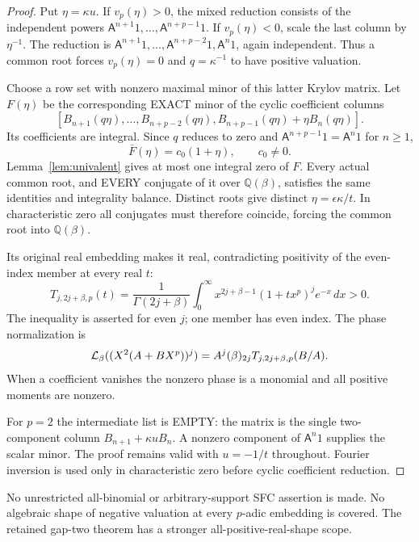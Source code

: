 \documentclass[11pt]{article}
\begin{document}
\begin{proof}
Put $\eta=\kappa u$. If $v_p(\eta)>0$, the mixed reduction consists
of the independent powers
$\mathsf A^{n+1}1,\ldots,\mathsf A^{n+p-1}1$.
If $v_p(\eta)<0$, scale the last column by $\eta^{-1}$.
The reduction is
$\mathsf A^{n+1}1,\ldots,\mathsf A^{n+p-2}1,\mathsf A^{n}1$,
again independent. Thus a common root forces $v_p(\eta)=0$
and $q=\kappa^{-1}$ to have positive valuation.

Choose a row set with nonzero maximal minor of this latter
Krylov matrix. Let $F(\eta)$ be the corresponding EXACT minor
of the cyclic coefficient columns
\[
 [B_{n+1}(q\eta),\ldots,B_{n+p-2}(q\eta),
                   B_{n+p-1}(q\eta)+\eta B_n(q\eta)].
\]
Its coefficients are integral. Since $q$ reduces to zero and
$\mathsf A^{n+p-1}1=\mathsf A^{n}1$ for $n\ge1$,
\[
 \bar F(\eta)=c_0(1+\eta),\qquad c_0\ne0.
\]
Lemma~\ref{lem:univalent} gives at most one integral zero of $F$.
Every actual common root, and EVERY conjugate of it over
$\mathbb Q(\beta)$, satisfies the same identities and integrality
balance. Distinct roots give distinct $\eta=\epsilon\kappa/t$.
In characteristic zero all conjugates must therefore coincide,
forcing the common root into $\mathbb Q(\beta)$.

Its original real embedding makes it real, contradicting positivity
of the even-index member at every real $t$:
\[
 T_{j,2j+\beta,p}(t)=\frac1{\Gamma(2j+\beta)}
       \int_0^\infty x^{2j+\beta-1}(1+tx^p)^j e^{-x}\,dx>0.
\]
The inequality is asserted for even $j$; one member has even index.
The phase normalization is
\[
 {\cal L}_\beta((X^2(A+BX^p))^j)
       =A^j(\beta)_{2j}T_{j,2j+\beta,p}(B/A).
\]
When a coefficient vanishes the nonzero phase is a monomial and all
positive moments are nonzero.

For $p=2$ the intermediate list is EMPTY: the matrix is the single
two-component column $B_{n+1}+\kappa uB_n$.
A nonzero component of $\mathsf A^n1$ supplies the scalar minor.
The proof remains valid with $u=-1/t$ throughout.
Fourier inversion is used only in characteristic zero before
cyclic coefficient reduction.
\end{proof}
No unrestricted all-binomial or arbitrary-support SFC assertion is made.
No algebraic shape of negative valuation at every $p$-adic embedding
is covered. The retained gap-two theorem has a stronger
all-positive-real-shape scope.
\end{document}
